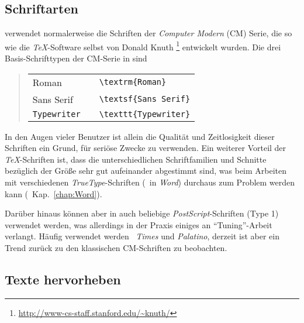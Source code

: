 \subsection{Schriftarten}

\latex verwendet normalerweise die Schriften der \emph{Computer
Modern}
(CM) Serie, die so wie die \emph{TeX}-Software selbst von Donald Knuth%
\footnote{\url{http://www-cs-staff.stanford.edu/~knuth/}} entwickelt
wurden. Die drei Basis-Schrifttypen der CM-Serie in \latex sind
%
\begin{quote}
\begin{tabular}{lcl}
\textrm{Roman}      & & \verb!\textrm{Roman}!\\
\textsf{Sans Serif} & & \verb!\textsf{Sans Serif}!\\
\texttt{Typewriter} & & \verb!\texttt{Typewriter}!\\
\end{tabular}
\end{quote}
%
\noindent In den Augen vieler Benutzer ist allein die Qualität und
Zeitlosigkeit dieser Schriften ein Grund, \latex für seriöse
Zwecke zu verwenden. Ein weiterer Vorteil der \emph{TeX}-Schriften
ist, dass die unterschiedlichen Schriftfamilien und Schnitte
bezüglich der Größe sehr gut aufeinander abgestimmt sind, was %
beim Arbeiten mit verschiedenen \emph{TrueType}-Schriften (\zB\ in
\emph{Word}) durchaus zum Problem werden kann (\sa\ Kap.\
\ref{chap:Word}).

Darüber hinaus können aber in \latex auch beliebige 
\emph{PostScript}-Schrif\-ten (Type 1) verwendet werden, was allerdings in
der Praxis einiges an "`Tuning"'-Arbeit verlangt. Häufig verwendet
werden \zB\ \emph{Times} und \emph{Palatino}, derzeit ist aber ein Trend 
zurück zu den klassischen CM-Schriften zu beobachten.



\subsection{Texte hervorheben}

